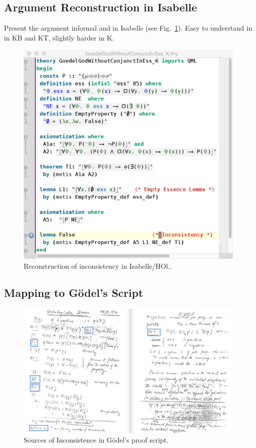 \documentclass{article}
\begin{document}
\subsection{Argument Reconstruction in Isabelle}
Present the argument informal and in Isabelle (see
Fig.~\ref{InconsistencyIsabelleK}). Easy to understand in 
in KB and KT, slightly harder in K.
\begin{figure}
\centerline{\includegraphics[width=\textwidth]{./Images/InconsistencyIsabelleK.png}}
\caption{Reconstruction of inconsistency in Isabelle/HOl..} \label{InconsistencyIsabelleK}
\end{figure}


\subsection{Mapping to Gödel's Script}
\begin{figure}
\centerline{\includegraphics[width=\textwidth]{./Images/Manuscript2.png}}
\caption{Sources of Inconsistence in G\"{o}del's proof script.} \label{GoedelScript}
\end{figure}
\end{document}
